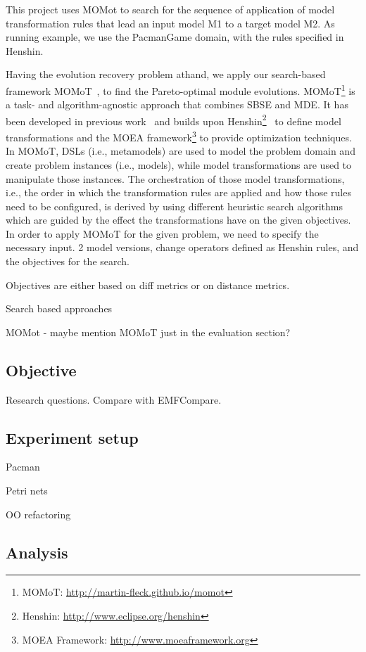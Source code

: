 This project uses MOMot to search for the sequence of application of model transformation rules that lead an input model M1 to a target model M2. As running example, we use the PacmanGame domain, with the rules specified in Henshin.

Having the evolution recovery problem athand, we apply our search-based framework MOMoT~\cite{Fleck15,FleckTW16}, to find the Pareto-optimal module evolutions. MOMoT\footnote{MOMoT: \url{http://martin-fleck.github.io/momot}} is a task- and algorithm-agnostic approach that combines SBSE and MDE.
It has been developed in previous work~\cite{Fleck15} and builds upon Henshin\footnote{Henshin: \url{http://www.eclipse.org/henshin}}~\cite{Arendt10} to define model transformations and the MOEA framework\footnote{MOEA Framework: \url{http://www.moeaframework.org}} to provide optimization techniques. In MOMoT, DSLs (i.e., metamodels) are used to model the problem domain and create problem instances (i.e., models), while model transformations are used to manipulate those instances.
The orchestration of those model transformations, i.e., the order in which the transformation rules are applied and how those rules need to be configured, is derived by using different heuristic search algorithms which are guided by the effect the transformations have on the given objectives.
In order to apply MOMoT for the given problem, we need to specify the necessary input.
2 model versions, change operators defined as Henshin rules, and the objectives for the search.

Objectives are either based on diff metrics or on distance metrics.


Search based approaches

MOMot - maybe mention MOMoT just in the evaluation section?

\subsection{Objective}
Research questions.
Compare with EMFCompare.

\subsection{Experiment setup}

Pacman

Petri nets

OO refactoring

\subsection{Analysis}

